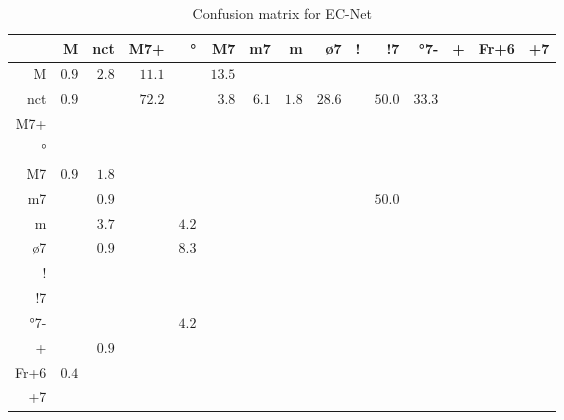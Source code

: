 \documentclass{article}
\begin{document}
\begin{table}
\begin{center}
\begin{tabular}{r|r|r|r|r|r|r|r|r|r|r|r|r|r|r}
       & M & nct & M7+ & ° & M7 & m7 & m & ø7 & ! & !7 & °7- & + & Fr+6 & +7 \\ \hline
 M & $0.9$ & $2.8$ & $11.1$ & $ $ & $13.5$ & $ $ & $ $ & $ $ & $ $ & $ $ & $ $ & $ $ & $ $ & $ $  \\ \hline
 nct & $0.9$ & $ $ & $72.2$ & $ $ & $3.8$ & $6.1$ & $1.8$ & $28.6$ & $ $ & $50.0$ & $33.3$ & $ $ & $ $ & $ $  \\ \hline
 M7+ & $ $ & $ $ & $ $ & $ $ & $ $ & $ $ & $ $ & $ $ & $ $ & $ $ & $ $ & $ $ & $ $ & $ $  \\ \hline
 ° & $ $ & $ $ & $ $ & $ $ & $ $ & $ $ & $ $ & $ $ & $ $ & $ $ & $ $ & $ $ & $ $ & $ $  \\ \hline
 M7 & $0.9$ & $1.8$ & $ $ & $ $ & $ $ & $ $ & $ $ & $ $ & $ $ & $ $ & $ $ & $ $ & $ $ & $ $  \\ \hline
 m7 & $ $ & $0.9$ & $ $ & $ $ & $ $ & $ $ & $ $ & $ $ & $ $ & $50.0$ & $ $ & $ $ & $ $ & $ $  \\ \hline
 m & $ $ & $3.7$ & $ $ & $4.2$ & $ $ & $ $ & $ $ & $ $ & $ $ & $ $ & $ $ & $ $ & $ $ & $ $  \\ \hline
 ø7 & $ $ & $0.9$ & $ $ & $8.3$ & $ $ & $ $ & $ $ & $ $ & $ $ & $ $ & $ $ & $ $ & $ $ & $ $  \\ \hline
 ! & $ $ & $ $ & $ $ & $ $ & $ $ & $ $ & $ $ & $ $ & $ $ & $ $ & $ $ & $ $ & $ $ & $ $  \\ \hline
 !7 & $ $ & $ $ & $ $ & $ $ & $ $ & $ $ & $ $ & $ $ & $ $ & $ $ & $ $ & $ $ & $ $ & $ $  \\ \hline
 °7- & $ $ & $ $ & $ $ & $4.2$ & $ $ & $ $ & $ $ & $ $ & $ $ & $ $ & $ $ & $ $ & $ $ & $ $  \\ \hline
 + & $ $ & $0.9$ & $ $ & $ $ & $ $ & $ $ & $ $ & $ $ & $ $ & $ $ & $ $ & $ $ & $ $ & $ $  \\ \hline
 Fr+6 & $0.4$ & $ $ & $ $ & $ $ & $ $ & $ $ & $ $ & $ $ & $ $ & $ $ & $ $ & $ $ & $ $ & $ $  \\ \hline
 +7 & $ $ & $ $ & $ $ & $ $ & $ $ & $ $ & $ $ & $ $ & $ $ & $ $ & $ $ & $ $ & $ $ & $ $  \\ \hline
\end{tabular}
\caption{Confusion matrix for EC-Net}
\end{center}
\end{table}
\end{document}
